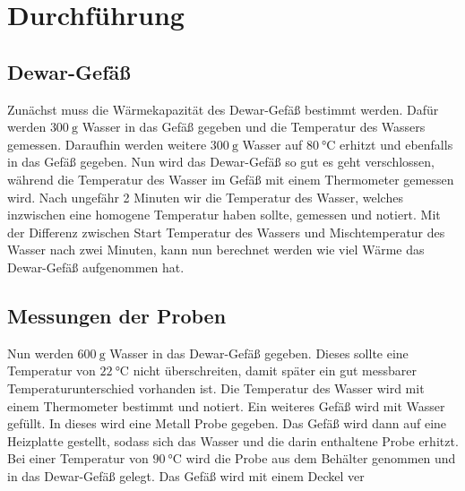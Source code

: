 \section{Durchführung}
\label{sec:Durchführung}

\subsection{Dewar-Gefäß}
Zunächst muss die Wärmekapazität des Dewar-Gefäß bestimmt werden.
Dafür werden $\SI{300}{\gram}$ Wasser in das Gefäß gegeben und die Temperatur des Wassers gemessen.
Daraufhin werden weitere $\SI{300}{\gram}$ Wasser auf $\SI{80}{\celsius}$ erhitzt und ebenfalls in das Gefäß gegeben.
Nun wird das Dewar-Gefäß so gut es geht verschlossen, während die Temperatur des Wasser im Gefäß mit einem Thermometer gemessen wird.
Nach ungefähr 2 Minuten wir die Temperatur des Wasser, welches inzwischen eine homogene Temperatur haben sollte, gemessen und notiert.
Mit der Differenz zwischen Start Temperatur des Wassers und Mischtemperatur des Wasser nach zwei Minuten, kann nun berechnet werden wie viel Wärme das Dewar-Gefäß aufgenommen hat.

\subsection{Messungen der Proben}
Nun werden $\SI{600}{\gram}$ Wasser in das Dewar-Gefäß gegeben.
Dieses sollte eine Temperatur von $\SI{22}{\celsius}$ nicht überschreiten, damit später ein gut messbarer Temperaturunterschied vorhanden ist.
Die Temperatur des Wasser wird mit einem Thermometer bestimmt und notiert.
Ein weiteres Gefäß wird mit Wasser gefüllt. 
In dieses wird eine Metall Probe gegeben.
Das Gefäß wird dann auf eine Heizplatte gestellt, sodass sich das Wasser und die darin enthaltene Probe erhitzt.
Bei einer Temperatur von $\SI{90}{\celsius}$ wird die Probe aus dem Behälter genommen und in das Dewar-Gefäß gelegt.
Das Gefäß wird mit einem Deckel ver